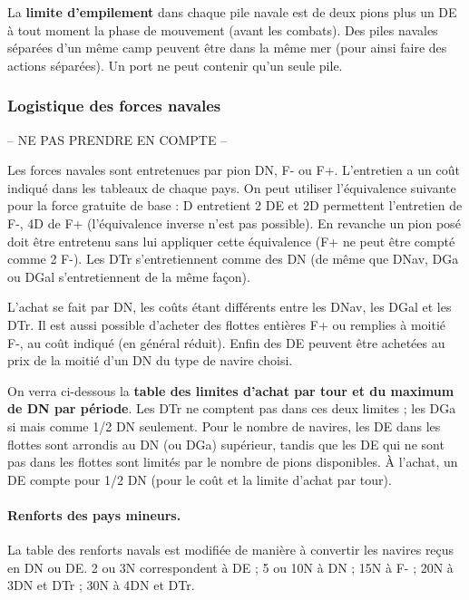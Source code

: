 La \textbf{limite d'empilement} dans chaque pile navale
est de deux pions plus un DE à tout moment
la phase de mouvement (avant les combats). Des piles
navales séparées d'un même camp peuvent  être dans la même
mer (pour ainsi faire des
actions séparées). Un port ne peut contenir qu'un seule pile.


\subsubsection{Logistique des forces navales}
-- NE PAS PRENDRE EN COMPTE --

Les forces navales sont entretenues par pion DN, F- ou F+. L'entretien
a un coût indiqué dans les tableaux de chaque pays. On peut
utiliser l'équivalence suivante pour la force gratuite de base : D entretient 2 DE et
2D permettent l'entretien de F-, 4D de F+ (l'équivalence inverse n'est pas possible).
En revanche un pion posé doit être entretenu sans lui appliquer cette
équivalence (F+ ne peut être compté comme 2 F-). Les DTr s'entretiennent comme des
DN (de même que DNav, DGa ou DGal s'entretiennent de la même façon).

L'achat se fait par DN, les coûts étant différents entre les DNav,
les DGal et les DTr. Il est aussi possible d'acheter des flottes entières F+
ou remplies à moitié F-, au coût indiqué (en général réduit). Enfin
des DE peuvent être achetées au prix de la moitié d'un DN du type
de navire choisi.

On verra ci-dessous la \textbf{table des limites d'achat par tour et du maximum
de DN par période}. Les DTr ne comptent pas dans ces deux limites ; les DGa si mais
comme 1/2 DN seulement.
Pour le nombre de navires, les DE dans les flottes sont arrondis au DN (ou DGa)
supérieur, tandis que les DE qui ne sont pas dans les flottes sont limités par
le nombre de pions disponibles. À l'achat, un DE compte pour 1/2 DN (pour
le coût et la limite d'achat par tour).

\paragraph{Renforts des pays mineurs.}
La table des renforts navals est modifiée de manière à convertir
les navires reçus en DN ou DE. 2 ou 3N correspondent à DE ;
5 ou 10N à DN ; 15N à F- ; 20N à 3DN et DTr ; 30N à 4DN et DTr.


